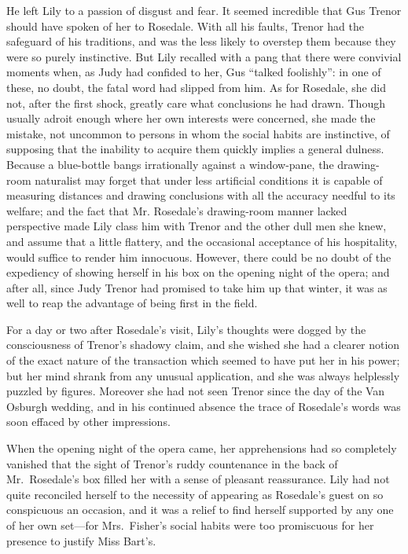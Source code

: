 \documentclass[12pt,a4paper]{book}
\begin{document}
He left Lily to a passion of disgust and fear. It seemed
incredible that Gus Trenor should have spoken of her to Rosedale. 
With all his faults, Trenor had the safeguard of his traditions,
and was the less likely to overstep them because they were so
purely instinctive. But Lily recalled with a pang that there were
convivial moments when, as Judy had confided to her, Gus ``talked
foolishly'': in one of these, no doubt, the fatal word had slipped
from him. As for Rosedale, she did not, after the first shock,
greatly care what conclusions he had drawn. Though usually adroit
enough where her own interests were concerned, she made the
mistake, not uncommon to persons in whom the social habits are
instinctive, of supposing that the inability to acquire them
quickly implies a general dulness. Because a blue-bottle
bangs irrationally against a window-pane, the drawing-room
naturalist may forget that under less artificial conditions it is
capable of measuring distances and drawing conclusions with all
the accuracy needful to its welfare; and the fact that Mr.
Rosedale's drawing-room manner lacked perspective made Lily class
him with Trenor and the other dull men she knew, and assume that
a little flattery, and the occasional acceptance of his
hospitality, would suffice to render him innocuous. However,
there could be no doubt of the expediency of showing herself in
his box on the opening night of the opera; and after all, since
Judy Trenor had promised to take him up that winter, it was as
well to reap the advantage of being first in the field.





For a day or two after Rosedale's visit, Lily's thoughts were
dogged by the consciousness of Trenor's shadowy claim, and she
wished she had a clearer notion of the exact nature of the
transaction which seemed to have put her in his power; but her
mind shrank from any unusual application, and she was always
helplessly puzzled by figures. Moreover she had not seen Trenor
since the day of the Van Osburgh wedding, and in his continued
absence the trace of Rosedale's words was soon effaced by other
impressions.





When the opening night of the opera came, her apprehensions had
so completely vanished that the sight of Trenor's ruddy
countenance in the back of Mr.\ Rosedale's box filled her with a
sense of pleasant reassurance. Lily had not quite reconciled
herself to the necessity of appearing as Rosedale's guest on so
conspicuous an occasion, and it was a relief to find herself
supported by any one of her own set---for Mrs.\ Fisher's social
habits were too promiscuous for her presence to justify Miss
Bart's.
\end{document}
